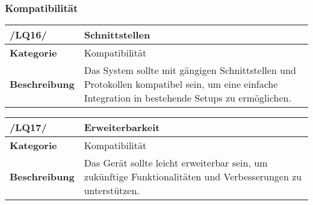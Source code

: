 \subsubsection{Kompatibilität}

\begin{table}[h!]
\begin{tabularx}{13cm}{|l|X|}
\hline
\textbf{/LQ16/} & \textbf{Schnittstellen} \\ \hline
\textbf{Kategorie} & Kompatibilität \\ \hline
\textbf{Beschreibung} & Das System sollte mit gängigen Schnittstellen und Protokollen kompatibel sein, um eine einfache Integration in bestehende Setups zu ermöglichen. \\ \hline
\end{tabularx}
\end{table}

\begin{table}[h!]
\begin{tabularx}{13cm}{|l|X|}
\hline
\textbf{/LQ17/} & \textbf{Erweiterbarkeit} \\ \hline
\textbf{Kategorie} & Kompatibilität \\ \hline
\textbf{Beschreibung} & Das Gerät sollte leicht erweiterbar sein, um zukünftige Funktionalitäten und Verbesserungen zu unterstützen. \\ \hline
\end{tabularx}
\end{table}

